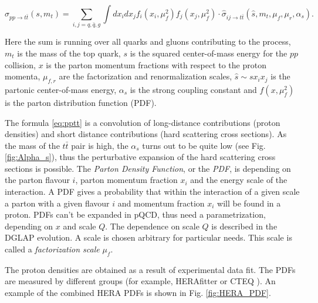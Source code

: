 \begin{equation} \label{eq:pptt}
 \sigma_{pp \rightarrow t\bar{t}} (s, m_{t}) = \sum_{i,j = q, \bar{q}, g} \int dx_{i} dx_{j} f_{i}(x_{i}, \mu_{f}^{2}) f_{j}(x_{j}, \mu_{f}^{2}) \cdot \hat{\sigma}_{ij \rightarrow t\bar{t}}(\hat{s}, m_{t}, \mu_{f}, \mu_{r}, \alpha_{s}).
\end{equation}

Here the sum is running over all quarks and gluons contributing to the process, $m_{t}$ is the mass of the top quark, $s$ is the squared center-of-mass 
energy for the $pp$ collision, $x$ is the parton momentum fractions with respect to the proton momenta, $\mu_{f,r}$ are the factorization and renormalization 
scales, $\hat{s} \sim sx_{i}x_{j}$ is the partonic center-of-mass energy, $\alpha_{s}$ is the strong coupling constant and  $f(x, \mu_{f}^{2})$ is the parton distribution
function (PDF). 

The formula \ref{eq:pptt} is a convolution of long-distance contributions (proton densities) and short distance contributions (hard scattering cross sections). 
As the mass of the $t\bar{t}$ pair is high, the $\alpha_{s}$ turns out
to be quite low (see Fig. \ref{fig:Alpha_s}), thus the perturbative expansion of the hard scattering cross sections is possible.
The \textit{Parton Density Function}, or the \textit{PDF}, is depending on the parton flavour $i$, parton momentum
fraction $x_{i}$ and the energy scale of the interaction. A PDF gives a probability that within the interaction of a given scale a parton with a given flavour $i$
and momentum fraction $x_{i}$ will be found in a proton. PDFs can't be expanded in pQCD, thus need a parametrization, depending on $x$ and scale $Q$. The dependence
on scale $Q$ is described in the DGLAP evolution\cite{Altarelli:1977zs, Dokshitzer:1977sg, Gribov:1972ri}. A scale is chosen arbitrary for particular needs.
This scale is called a \textit{factorization scale} $\mu_{f}$.

The proton densities are obtained as a result of experimental data fit.
The PDFs are measured by different groups (for example, HERAfitter \cite{Alekhin:2014irh} or 
CTEQ \cite{Pumplin:2002vw}). An example of the combined HERA PDFs is shown in Fig. \ref{fig:HERA_PDF}.


